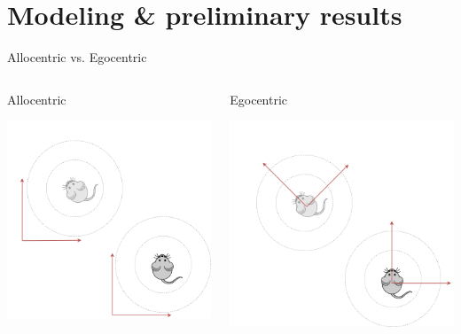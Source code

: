 \documentclass[bigger]{beamer}
\begin{document}
\section{Modeling \& preliminary results}
\label{sec:org4a9499c}
\begin{frame}[label={sec:orgcf978ef}]{Allocentric vs. Egocentric}
\begin{columns}
\begin{column}{0.5\columnwidth}
\begin{center}
Allocentric
\end{center}
\begin{center}
\includegraphics[width=.9\linewidth]{img/ego-vs-allo-allo.drawio.png}
\end{center}
\end{column}
\begin{column}{0.5\columnwidth}
\begin{center}
Egocentric
\end{center}
\begin{center}
\includegraphics[width=.9\linewidth]{img/ego-vs-allo-ego.drawio.png}

\end{center}
\end{column}
\end{columns}
\end{frame}
\end{document}
